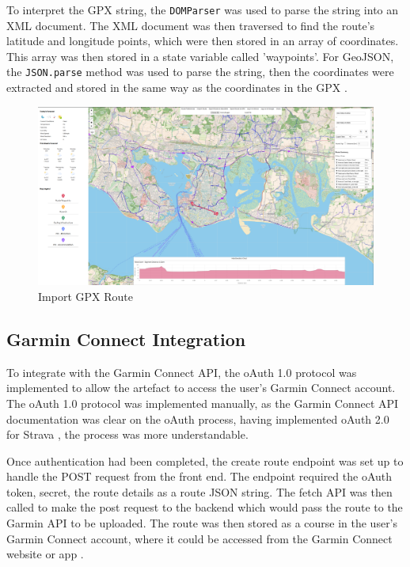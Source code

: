 To interpret the GPX string, the \texttt{DOMParser} was used to parse the string into an XML document. The XML document was then traversed to find the route's latitude and longitude points, which were then stored in an array of coordinates. This array was then stored in a state variable called 'waypoints'. For GeoJSON, the \texttt{JSON.parse} method was used to parse the string, then the coordinates were extracted and stored in the same way as the coordinates in the GPX .

\label{fig:route-import}
\begin{figure}[!ht]
  \centering
  \includegraphics[width=425px]{figures/Progress Images/Iteration-3/SR48-49/SR48-Import GPX.png}
  \caption{Import GPX Route}
  \label{fig:gpx-import}
\end{figure}

\subsection{Garmin Connect Integration}
\label{iteration3:garmin-integration}

To integrate with the Garmin Connect API, the oAuth 1.0 protocol was implemented to allow the artefact to access the user's Garmin Connect account. The oAuth 1.0 protocol was implemented manually, as the Garmin Connect API documentation was clear on the oAuth process, having implemented oAuth 2.0 for Strava , the process was more understandable.

Once authentication had been completed, the create route endpoint was set up to handle the POST request from the front end. The endpoint required the oAuth token, secret, the route details as a route JSON string. The fetch API was then called to make the post request to the backend which would pass the route to the Garmin API to be uploaded. The route was then stored as a course in the user's Garmin Connect account, where it could be accessed from the Garmin Connect website or app . 

